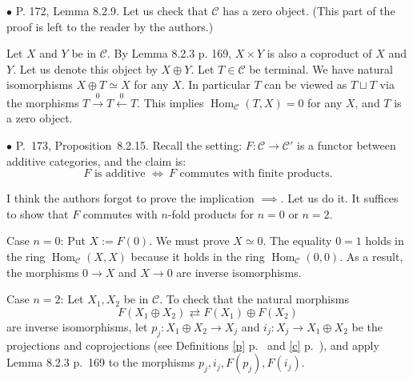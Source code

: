 \documentclass[12pt]{article}
\theoremstyle{remark}%
\newcommand{\bu}{\bullet}
\newcommand{\n}{\noindent}
\newcommand{\C}{\mathcal C}
\newcommand{\xl}{\xleftarrow}
\newcommand{\xr}{\xrightarrow}
\newcommand{\be}{\begin{equation}}
\newcommand{\ee}{\end{equation}}
\newcommand{\pr}{Proposition}
\DeclareMathOperator{\Hom}{Hom}
\DeclareMathOperator{\h}{Hom}
\begin{document}

\n$\bu$ P. 172, Lemma 8.2.9. Let us check that $\C$ has a zero object. (This part of the proof is left to the reader by the authors.) 

Let $X$ and $Y$ be in $\C$. By Lemma 8.2.3 p. 169, $X\times Y$ is also a coproduct of $X$ and $Y$. Let us denote this object by $X\oplus Y$. Let $T\in\C$ be terminal. We have natural isomorphisms $X\oplus T\simeq X$ for any $X$. In particular $T$ can be viewed as $T\sqcup T$ via the morphisms $T\xr0T\xl0T$. This implies $\h_\C(T,X)=0$ for any $X$, and $T$ is a zero object. 


\n$\bu$ P.~173, \pr\ 8.2.15. Recall the setting: $F:\C\to\C'$ is a functor between additive categories, and the claim is: 
$$
F\text{ is additive }\iff\ F\text{ commutes with finite products}.
$$ 

I think the authors forgot to prove the implication $\implies$. Let us do it. It suffices to show that $F$ commutes with $n$-fold products for $n=0$ or $n=2$. 

Case $n=0$: Put $X:=F(0)$. We must prove $X\simeq 0$. The equality $0=1$ holds in the ring $\Hom_\C(X,X)$ because it holds in the ring $\Hom_\C(0,0)$. As a result, the morphisms $0\to X$ and $X\to 0$ are inverse isomorphisms. 

Case $n=2$: Let $X_1,X_2$ be in $\C$. To check that the natural morphisms 
%
\be\label{173} 
F(X_1\oplus X_2)\rightleftarrows F(X_1)\oplus F(X_2)
\ee 
% 
are inverse isomorphisms, let $p_j:X_1\oplus X_2\to X_j$ and $i_j:X_j\to X_1\oplus X_2$ be the projections and coprojections (see Definitions \ref{p} p.~\pageref{p} and \ref{c} p.~\pageref{c}), and apply Lemma 8.2.3 p.~169 to the morphisms $p_j,i_j,F(p_j),F(i_j)$. 

\end{document}

